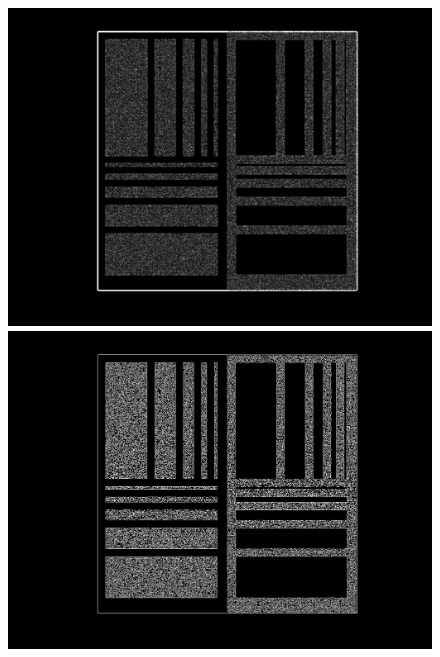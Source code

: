 \documentclass[a4paper]{article} %
\begin{document}
\begin{figure}[!htb]
  \includegraphics[width=\linewidth]{lap_Eq_Phantom_0p000_4_1_1.jpg}
\endminipage\hfill
{}%
  \includegraphics[width=\linewidth]{canny_Eq_Phantom_0p000_4_1_1.jpg}
\endminipage\hfill
{}%

\end{figure}
\end{document}
